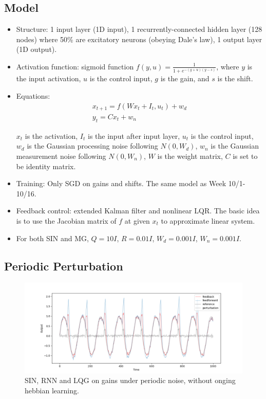 \documentclass[12pt, a4paper]{article}
\begin{document}
\subsection*{Model}
\begin{itemize}
    \item Structure: 1 input layer (1D input), 1 recurrently-connected hidden layer (128 nodes) where 50\% are excitatory neurons (obeying Dale's law), 1 output layer (1D output).

    \item Activation function: sigmoid function $f(y, u) = \frac{1}{1 + e^{-(g + u)(y - s)}}$, where $y$ is the input activation, $u$ is the control input, $g$ is the gain, and $s$ is the shift. 
    
    \item Equations: 
    \begin{eqnarray}
    \nonumber
    x_{t+1} = f(Wx_t + I_{t}, u_{t}) + w_d \\
    \nonumber
    y_t = Cx_{t} + w_n
    \end{eqnarray}
    
    $x_t$ is the activation, $I_t$ is the input after input layer, $u_t$ is the control input, $w_d$ is the Gaussian processing noise following $N(0,W_d)$, $w_n$ is the Gaussian measurement noise following $N(0,W_n)$, $W$ is the weight matrix, $C$ is set to be identity matrix.

    \item Training: Only SGD on gains and shifts. The same model as Week 10/1-10/16.

    \item Feedback control: extended Kalman filter and nonlinear LQR. The basic idea is to use the Jacobian matrix of $f$ at given $x_t$ to approximate linear system.
    
    \item For both SIN and MG, $Q = 10I$, $R = 0.01I$, $W_d = 0.001I$, $W_n = 0.001I$.

\end{itemize}

\newpage

\subsection*{Periodic Perturbation}

\begin{figure}[H]
    \centering
    \includegraphics[width=\textwidth]{analysis/fig/1113_SIN_lqg.png}
    \caption{SIN, RNN and LQG on gains under periodic noise, without onging hebbian learning.}
\end{figure}
\end{document}
